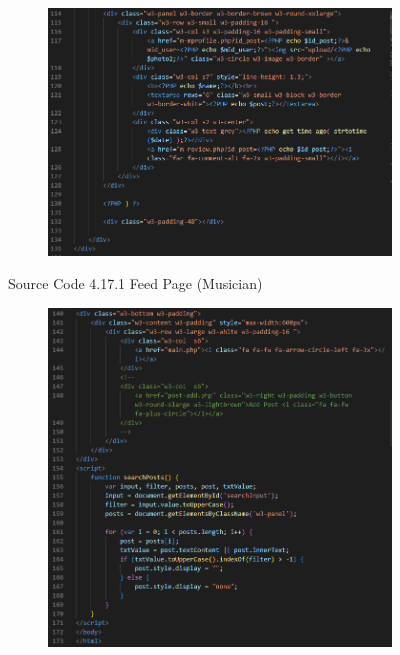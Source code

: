 \begin{enumerate}[1.]
\begin{figure}[h]
\begin{subfigure}[b]{0.8\textwidth}
            \label{fig:sub1}
        \end{subfigure}
        \hspace{0.04\textwidth}
        \begin{subfigure}[b]{0.8\textwidth}
            \centering
            \includegraphics[width=\textwidth]{mainmatter/images/frontend/code/musicfeed2.png}
            \label{fig:sub2}
        \end{subfigure}
        \caption*{Source Code 4.17.1 Feed Page (Musician)}
        \label{fig:myfig56a}
    \end{figure}
    \clearpage
    \begin{figure}[h]\ContinuedFloat
        \centering
        \begin{subfigure}[b]{0.8\textwidth}
            \centering
            \includegraphics[width=\textwidth]{mainmatter/images/frontend/code/musicfeed3.png}

\end{subfigure}
\end{figure}
\end{enumerate}
